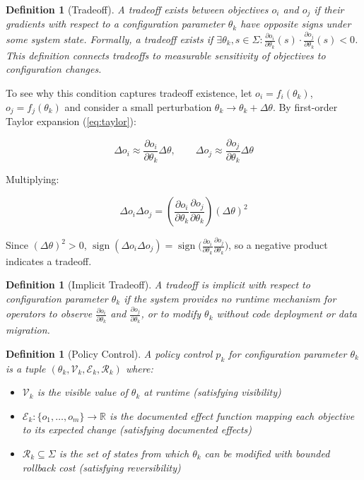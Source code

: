 \documentclass[conference]{IEEEtran}
\newtheorem{definition}[theorem]{Definition}
\begin{document}
{\color{red}
\begin{definition}[Tradeoff]
A tradeoff exists between objectives $o_i$ and $o_j$ if their gradients with respect to a configuration parameter $\theta_k$ have opposite signs under some system state. Formally, a tradeoff exists if $\exists \theta_k, s \in \Sigma: \frac{\partial o_i}{\partial \theta_k}(s) \cdot \frac{\partial o_j}{\partial \theta_k}(s) < 0$.
This definition connects tradeoffs to measurable sensitivity of objectives to configuration changes.
\end{definition}}

{\color{red}
To see why this condition captures tradeoff existence, let $o_i = f_i(\theta_k)$, $o_j = f_j(\theta_k)$ and consider a small perturbation $\theta_k \to \theta_k + \Delta\theta$. By first-order Taylor expansion (\eqref{eq:taylor}):

\begin{equation}
\Delta o_i \approx \frac{\partial o_i}{\partial \theta_k} \Delta\theta, \qquad
\Delta o_j \approx \frac{\partial o_j}{\partial \theta_k} \Delta\theta
\label{eq:taylor}
\end{equation}

Multiplying:

\begin{equation}
\Delta o_i \Delta o_j = \left(\frac{\partial o_i}{\partial \theta_k} \frac{\partial o_j}{\partial \theta_k}\right) (\Delta\theta)^2
\label{eq:product}
\end{equation}

Since $(\Delta\theta)^2 > 0$, $\operatorname{sign}(\Delta o_i \Delta o_j) = \operatorname{sign}\bigl(\frac{\partial o_i}{\partial \theta_k} \frac{\partial o_j}{\partial \theta_k}\bigr)$, so a negative product indicates a tradeoff.}

{\color{red}
\begin{definition}[Implicit Tradeoff]
A tradeoff is \textit{implicit} with respect to configuration parameter $\theta_k$ if the system provides no runtime mechanism for operators to observe $\frac{\partial o_i}{\partial \theta_k}$ and $\frac{\partial o_j}{\partial \theta_k}$, or to modify $\theta_k$ without code deployment or data migration.
\end{definition}}

{\color{red}
\begin{definition}[Policy Control]
A policy control $p_k$ for configuration parameter $\theta_k$ is a tuple $(\theta_k, \mathcal{V}_k, \mathcal{E}_k, \mathcal{R}_k)$ where:
\begin{itemize}
    \item $\mathcal{V}_k$ is the visible value of $\theta_k$ at runtime (satisfying visibility)
    \item $\mathcal{E}_k: \{o_1,\ldots,o_m\} \to \mathbb{R}$ is the documented effect function mapping each objective to its expected change (satisfying documented effects)
    \item $\mathcal{R}_k \subseteq \Sigma$ is the set of states from which $\theta_k$ can be modified with bounded rollback cost (satisfying reversibility)
\end{itemize}
\end{definition}}
\end{document}
